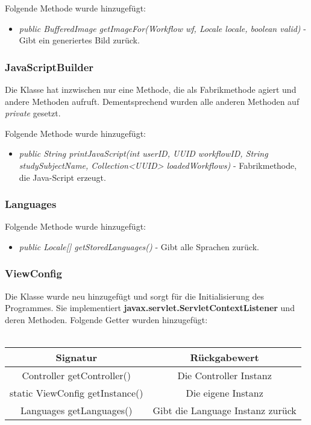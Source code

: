 \documentclass[parskip=full]{scrartcl}
\begin{document}
				Folgende Methode wurde hinzugefügt:
				\begin{itemize}
					\item \textit{public BufferedImage getImageFor(Workflow wf, Locale locale, boolean valid)} - Gibt ein generiertes Bild zurück.
				\end{itemize}
		
			\subsubsection{JavaScriptBuilder}
				Die Klasse hat inzwischen nur eine Methode, die als Fabrikmethode agiert und andere Methoden aufruft. Dementsprechend wurden alle anderen Methoden auf \textit{private} gesetzt.
		
				Folgende Methode wurde hinzugefügt:
				\begin{itemize}
					\item \textit{public String printJavaScript(int userID, UUID workflowID, String studySubjectName, Collection<UUID> loadedWorkflows)} - Fabrikmethode, die Java-Script erzeugt.
				\end{itemize}
		
			\subsubsection{Languages}
				Folgende Methode wurde hinzugefügt:
				\begin{itemize}
					\item \textit{public Locale[] getStoredLanguages()} - Gibt alle \glqq Sprachen\grqq{} zurück.
				\end{itemize}
		
			\subsubsection{ViewConfig}
				Die Klasse wurde neu hinzugefügt und sorgt für die Initialisierung des Programmes. Sie implementiert \textbf{javax.servlet.ServletContextListener} und deren Methoden.
				Folgende Getter wurden hinzugefügt:
				\\ \\
				\begin{tabular}{|c|c|}
					\hline 
					\textbf{Signatur} & \textbf{Rückgabewert} \\ 
					\hline 
					Controller getController() & Die Controller Instanz \\ 
					static ViewConfig getInstance() & Die eigene Instanz \\ 
					Languages getLanguages() & Gibt die Language Instanz zurück \\ 
					\hline 
				\end{tabular} 
			
\end{document}
